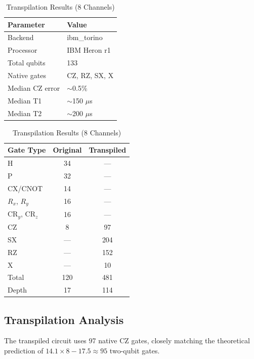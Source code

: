 \documentclass[pdflatex,sn-mathphys-num]{sn-jnl}
\begin{document}
\begin{table}[htbp]
\centering
\begin{minipage}{0.42\textwidth}
\centering
\caption{IBM Quantum Hardware Specifications}
\label{tab:hardware}
\begin{tabular}{ll}
\toprule
Parameter & Value \\
\midrule
Backend & ibm\_torino \\
Processor & IBM Heron r1 \\
Total qubits & 133 \\
Native gates & CZ, RZ, SX, X \\
Median CZ error & $\sim$0.5\% \\
Median T1 & $\sim$150 $\mu$s \\
Median T2 & $\sim$200 $\mu$s \\
\bottomrule
\end{tabular}
\end{minipage}
\hfill
\begin{minipage}{0.54\textwidth}
\centering
\caption{Transpilation Results (8 Channels)}
\label{tab:transpile}
\begin{tabular}{lcc}
\toprule
Gate Type & Original & Transpiled \\
\midrule
H & 34 & --- \\
P & 32 & --- \\
CX/CNOT & 14 & --- \\
$R_x$, $R_y$ & 16 & --- \\
CR$_y$, CR$_z$ & 16 & --- \\
CZ & 8 & 97 \\
SX & --- & 204 \\
RZ & --- & 152 \\
X & --- & 10 \\
\midrule
Total & 120 & 481 \\
Depth & 17 & 114 \\
\bottomrule
\end{tabular}
\end{minipage}
\end{table}

\subsection{Transpilation Analysis}
\label{sec:transpile}

The transpiled circuit uses 97 native CZ gates, closely matching the theoretical prediction of $14.1 \times 8 - 17.5 \approx 95$ two-qubit gates.
\end{document}

